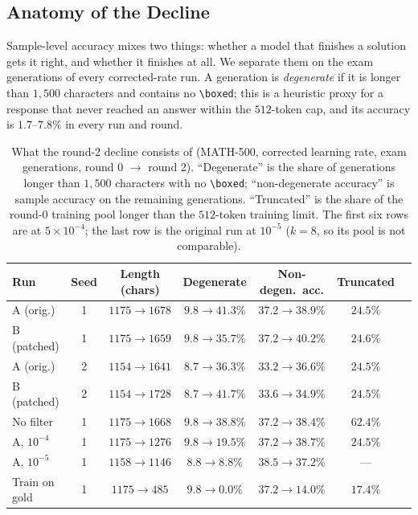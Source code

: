 \documentclass[runningheads]{llncs}
\begin{document}
\subsection{Anatomy of the Decline}
\label{sec:anatomy}

Sample-level accuracy mixes two things: whether a model that finishes a
solution gets it right, and whether it finishes at all. We separate them on the
exam generations of every corrected-rate run. A generation is
\emph{degenerate} if it is longer than $1{,}500$ characters and contains no
\texttt{\textbackslash boxed}; this is a heuristic proxy for a response that
never reached an answer within the $512$-token cap, and its accuracy is
$1.7$--$7.8\%$ in every run and round.

\begin{table}[t]
\caption{What the round-2 decline consists of (MATH-500, corrected learning
rate, exam generations, round 0 $\to$ round 2). ``Degenerate'' is the share
of generations longer than $1{,}500$ characters with no
\texttt{\textbackslash boxed}; ``non-degenerate accuracy'' is sample accuracy
on the remaining generations. ``Truncated'' is the share of the round-0
training pool longer than the $512$-token training limit. The first six rows
are at $5\times10^{-4}$; the last row is the original run at $10^{-5}$
($k=8$, so its pool is not comparable).}
\label{tab:anatomy}
\centering
\setlength{\tabcolsep}{4pt}
\begin{tabular}{lcccccc}
\toprule
Run & Seed & Length (chars) & Degenerate & Non-degen.\ acc. & Truncated \\
\midrule
A (orig.)     & 1 & $1175\to1678$ & $9.8\to41.3\%$ & $37.2\to38.9\%$ & $24.5\%$ \\
B (patched)   & 1 & $1175\to1659$ & $9.8\to35.7\%$ & $37.2\to40.2\%$ & $24.6\%$ \\
A (orig.)     & 2 & $1154\to1641$ & $8.7\to36.3\%$ & $33.2\to36.6\%$ & $24.5\%$ \\
B (patched)   & 2 & $1154\to1728$ & $8.7\to41.7\%$ & $33.6\to34.9\%$ & $24.5\%$ \\
No filter     & 1 & $1175\to1668$ & $9.8\to38.8\%$ & $37.2\to38.4\%$ & $62.4\%$ \\
A, $10^{-4}$  & 1 & $1175\to1276$ & $9.8\to19.5\%$ & $37.2\to38.7\%$ & $24.5\%$ \\
A, $10^{-5}$  & 1 & $1158\to1146$ & $8.8\to8.8\%$  & $38.5\to37.2\%$ & --- \\
Train on gold & 1 & $1175\to485$  & $9.8\to0.0\%$  & $37.2\to14.0\%$ & $17.4\%$ \\
\bottomrule
\end{tabular}
\end{table}
\end{document}
